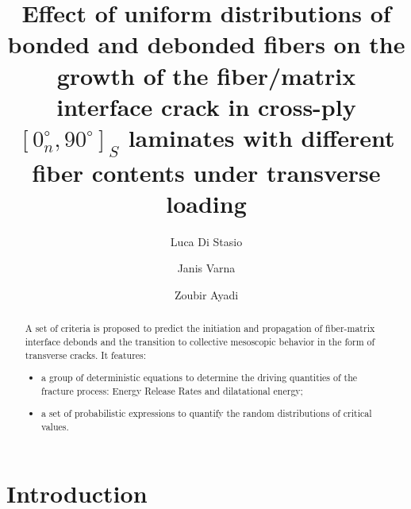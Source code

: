 \documentclass[review]{elsarticle}
\begin{document}
\begin{frontmatter}

\title{Effect of uniform distributions of bonded and debonded fibers on the growth of the fiber/matrix interface crack in cross-ply $\left[0^{\circ}_{n},90^{\circ}\right]_{S}$ laminates with different fiber contents under transverse loading}


\author[nancy,lulea]{Luca Di Stasio}
\author[lulea]{Janis Varna}
\author[nancy]{Zoubir Ayadi}


\address[nancy]{Universit\'e de Lorraine, EEIGM, IJL, 6 Rue Bastien Lepage, F-54010 Nancy, France}
\address[lulea]{Lule\aa\ University of Technology, University Campus, SE-97187 Lule\aa, Sweden}

\begin{abstract}
A set of criteria is proposed to predict the initiation and propagation of fiber-matrix interface debonds and the transition to collective mesoscopic behavior in the form of transverse cracks. It features:
\begin{itemize}
\item a group of deterministic equations to determine the driving quantities of the fracture process: Energy Release Rates and dilatational energy;
\item a set of probabilistic expressions to quantify the random distributions of critical values.
\end{itemize}
\end{abstract}


\end{frontmatter}

\linenumbers

\section{Introduction}
\end{document}

